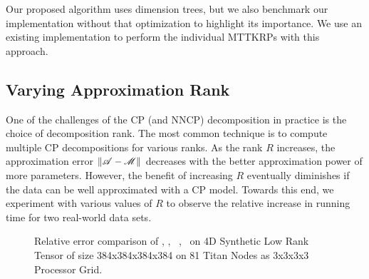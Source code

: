 Our proposed algorithm uses dimension trees, but we also benchmark our implementation without that optimization to highlight its importance.
We use an existing implementation to perform the individual MTTKRPs \cite{HBJT18} with this approach.

\subsection{Varying Approximation Rank}

One of the challenges of the CP (and NNCP) decomposition in practice is the choice of decomposition rank.
The most common technique is to compute multiple CP decompositions for various ranks.
As the rank $R$ increases, the approximation error  $\|\TA - \T{M}\|$ decreases with the better approximation power of more parameters. 
However, the benefit of increasing $R$ eventually diminishes if the data can be well approximated with a CP model.
Towards this end, we experiment with various values of $R$ to observe the relative increase in running time for two real-world data sets. 


\begin{figure}
\caption{Relative error comparison of \MU, \HALS, \BPP\, \ADMM, \Nestrov\ on 4D Synthetic Low Rank Tensor of size 384x384x384x384 on 81 Titan Nodes as 3x3x3x3 Processor Grid.}
\label{fig:convergencelowrank}
\end{figure}

